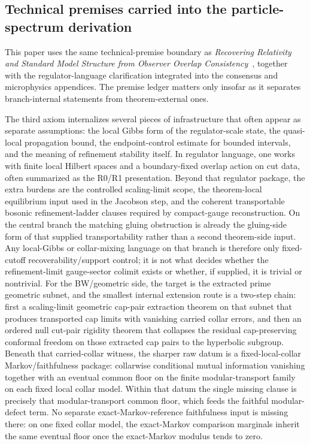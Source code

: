 \documentclass[11pt]{article}
\begin{document}
\subsection{Technical premises carried into the particle-spectrum derivation}

This paper uses the same technical-premise boundary as
\emph{Recovering Relativity and Standard Model Structure from Observer Overlap Consistency}~\cite{ophcompact}, together with
the regulator-language clarification integrated into the consensus and microphysics
appendices. The premise ledger matters only
insofar as it separates branch-internal statements from theorem-external ones.

The third axiom internalizes several pieces of infrastructure that often appear as separate
assumptions: the local Gibbs form of the regulator-scale state, the
quasi-local propagation bound, the endpoint-control estimate for bounded intervals, and the
meaning of refinement stability itself. In regulator language, one works with finite local
Hilbert spaces and a boundary-fixed overlap action on cut data, often summarized as the R0/R1
presentation. Beyond that regulator package, the extra burdens are the controlled scaling-limit
scope, the theorem-local equilibrium input used in the Jacobson step, and the coherent
transportable bosonic refinement-ladder clauses required by compact-gauge
reconstruction. On the central branch the matching gluing obstruction is already the gluing-side
form of that supplied transportability rather than a second theorem-side input. Any local-Gibbs
or collar-mixing language on that branch is therefore only fixed-cutoff recoverability/support
control; it is not what decides whether the
refinement-limit gauge-sector colimit exists or whether, if supplied, it is trivial or
nontrivial.
For the BW/geometric side, the target is the extracted prime geometric subnet, and the
smallest internal extension route is a two-step chain: first a scaling-limit geometric cap-pair extraction
theorem on that subnet that produces transported cap limits with vanishing carried collar errors,
and then an ordered null cut-pair rigidity theorem that
collapses the residual cap-preserving conformal freedom on those extracted cap pairs to the
hyperbolic subgroup. Beneath that carried-collar witness, the sharper raw datum is a fixed-local-collar
Markov/faithfulness package: collarwise conditional mutual information vanishing together with an
eventual common floor on the finite modular-transport family on each fixed local collar model. Within that datum the
single missing clause is precisely that modular-transport common floor, which feeds
the faithful modular-defect term. No separate exact-Markov-reference faithfulness input is
missing there: on one fixed collar model, the exact-Markov comparison marginals inherit the same
eventual floor once the exact-Markov modulus tends to zero.
\end{document}
